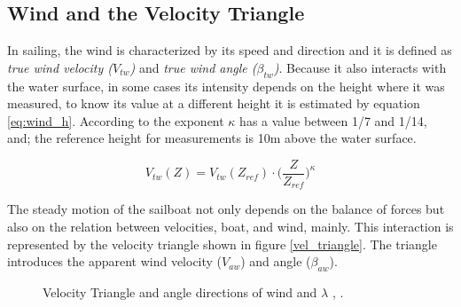 \subsection{Wind and the Velocity Triangle} \label{sec:wind_vel_trian}
In sailing, the wind is characterized by its speed and direction and it is defined as \textit{true wind velocity ($V_{tw}$)} and \textit{true wind angle ($\beta_{tw}$)}. Because it also interacts with the water surface, in some cases its intensity depends on the height where it was measured, to know its value at a different height it is estimated by equation \ref{eq:wind_h}. According to \cite{claughton1998sailing} the exponent $\kappa$ has a value between 1/7 and 1/14, and; the reference height for measurements is 10m above the water surface. \par 
\begin{equation}\label{eq:wind_h}
    V_{tw}(Z)=V_{tw}(Z_{ref}) \cdot \bigg( \frac{Z}{Z_{ref}} \bigg)^\kappa
\end{equation}

The steady motion of the sailboat not only depends on the balance of forces but also on the relation between velocities, boat, and wind, mainly. This interaction is represented by the velocity triangle shown in figure \ref{vel_triangle}. The triangle introduces the apparent wind velocity ($V_{aw}$) and angle ($\beta_{aw}$).\par 
{}

\begin{figure} %
  \centering
  \hfill
  \caption{Velocity Triangle and angle directions of wind and $\lambda$  \cite{marchajaereo1979}, \cite{larsonprinciples}.}
\label{fig:Vel_Trian_Ang} 
\end{figure}

